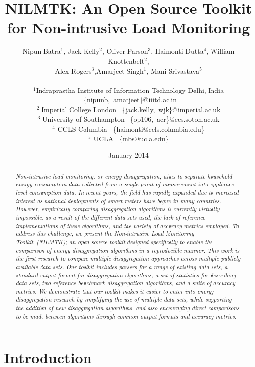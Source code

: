 \documentclass{sig-alternate}
\title{NILMTK: An Open Source Toolkit for Non-intrusive Load Monitoring}
\author{Nipun Batra$^1$, Jack Kelly$^2$, Oliver Parson$^3$, Haimonti Dutta$^4$, William Knottenbelt$^2$,\\ Alex Rogers$^3$,Amarjeet Singh$^1$, Mani Srivastava$^5$\\ \\
\small$^1$Indraprastha Institute of Information Technology Delhi, India ~\{nipunb,~amarjeet\}@iiitd.ac.in\\
\small$^2$ Imperial College London ~\{jack.kelly,~wjk\}@imperial.ac.uk\\
\small$^3$ University of Southampton ~\{op106,~acr\}@ecs.soton.ac.uk\\
\small$^4$ CCLS Columbia ~\{haimonti@ccls.columbia.edu\}\\
\small$^5$ UCLA ~\{mbs@ucla.edu\}\\
}
\date{January 2014}
\newcommand\Mark[1]{\textsuperscript#1}
\begin{document}
\maketitle



\begin{abstract}
\noindent
\textit{
Non-intrusive load monitoring, or energy disaggregation, aims to separate household energy consumption data collected from a single point of measurement into appliance-level consumption data. In recent years, the field has rapidly expanded due to increased interest as national deployments of smart meters have begun in many countries. However, empirically comparing disaggregation algorithms is currently virtually impossible, as a result of the different data sets used, the lack of reference implementations of these algorithms, and the variety of accuracy metrics employed. To address this challenge, we present the Non-intrusive Load Monitoring Toolkit~(NILMTK); an open source toolkit designed specifically to enable the comparison of energy disaggregation algorithms in a reproducible manner. This work is the first research to compare multiple disaggregation approaches across multiple publicly available data sets. Our toolkit includes parsers for a range of existing data sets, a standard output format for disaggregation algorithms, a set of statistics for describing data sets, two reference benchmark disaggregation algorithms, and a suite of accuracy metrics. We demonstrate that our toolkit makes it easier to enter into energy disaggregation research by simplifying the use of multiple data sets, while supporting the addition of new disaggregation algorithms, and also encouraging direct comparisons to be made between algorithms through common output formats and accuracy metrics. }
\end{abstract}

\section{Introduction}
\end{document}
